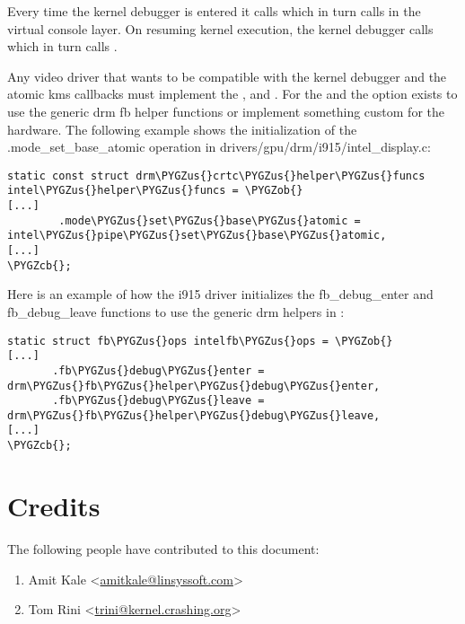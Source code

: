 \documentclass[a4paper,8pt,english]{sphinxmanual}
\def\PYGZus{\char`\_}
\def\PYGZob{\char`\{}
\def\PYGZcb{\char`\}}
\begin{document}
Every time the kernel debugger is entered it calls
 which in turn calls 
in the virtual console layer. On resuming kernel execution, the kernel
debugger calls  which in turn calls
.

Any video driver that wants to be compatible with the kernel debugger
and the atomic kms callbacks must implement the ,
 and . For the
 and  the option exists to use the
generic drm fb helper functions or implement something custom for the
hardware. The following example shows the initialization of the
.mode\_set\_base\_atomic operation in
drivers/gpu/drm/i915/intel\_display.c:

\begin{Verbatim}[commandchars=\\\{\}]
static const struct drm\PYGZus{}crtc\PYGZus{}helper\PYGZus{}funcs intel\PYGZus{}helper\PYGZus{}funcs = \PYGZob{}
[...]
        .mode\PYGZus{}set\PYGZus{}base\PYGZus{}atomic = intel\PYGZus{}pipe\PYGZus{}set\PYGZus{}base\PYGZus{}atomic,
[...]
\PYGZcb{};
\end{Verbatim}

Here is an example of how the i915 driver initializes the
fb\_debug\_enter and fb\_debug\_leave functions to use the generic drm
helpers in :

\begin{Verbatim}[commandchars=\\\{\}]
static struct fb\PYGZus{}ops intelfb\PYGZus{}ops = \PYGZob{}
[...]
       .fb\PYGZus{}debug\PYGZus{}enter = drm\PYGZus{}fb\PYGZus{}helper\PYGZus{}debug\PYGZus{}enter,
       .fb\PYGZus{}debug\PYGZus{}leave = drm\PYGZus{}fb\PYGZus{}helper\PYGZus{}debug\PYGZus{}leave,
[...]
\PYGZcb{};
\end{Verbatim}


\section{Credits}
\label{dev-tools/kgdb:credits}
The following people have contributed to this document:
\begin{enumerate}
\item {} 
Amit Kale \textless{}\href{mailto:amitkale@linsyssoft.com}{amitkale@linsyssoft.com}\textgreater{}

\item {} 
Tom Rini \textless{}\href{mailto:trini@kernel.crashing.org}{trini@kernel.crashing.org}\textgreater{}

\end{enumerate}
\end{document}
